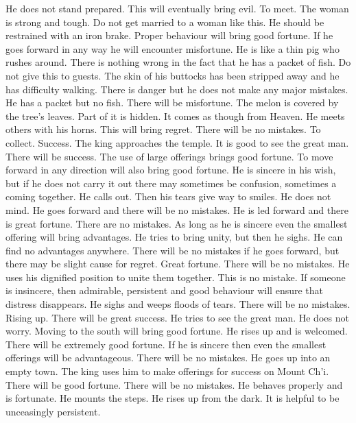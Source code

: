 	{He does not stand prepared. This will eventually bring evil.}
\or {}
	{To meet. The woman is strong and tough. Do not get married to a woman like this.}
	{He should be restrained with an iron brake. Proper behaviour will bring good fortune. If he goes forward
		in any way he will encounter misfortune. He is like a thin pig who rushes around.}
	{There is nothing wrong in the fact that he has a packet of fish. Do not give this to guests.}
	{The skin of his buttocks has been stripped away and he has difficulty walking. There is danger but he
		does not make any major mistakes.}
	{He has a packet but no fish. There will be misfortune.}
	{The melon is covered by the tree's leaves. Part of it is hidden. It comes as though from Heaven.}
	{He meets others with his horns. This will bring regret. There will be no mistakes.}
\or {}
	{To collect. Success. The king approaches the temple. It is good to see the great man. There will be
		success. The use of large offerings brings good fortune. To move forward in any direction
		will also bring good fortune.}
	{He is sincere in his wish, but if he does not carry it out there may sometimes be confusion, sometimes
		a coming together. He calls out. Then his tears give way to smiles. He does not mind. He goes
		forward and there will be no mistakes.}
	{He is led forward and there is great fortune. There are no mistakes. As long as he is sincere even the
		smallest offering will bring advantages.}
	{He tries to bring unity, but then he sighs. He can find no advantages anywhere. There will be no
		mistakes if he goes forward, but there may be slight cause for regret.}
	{Great fortune. There will be no mistakes.}
	{He uses his dignified position to unite them together. This is no mistake. If someone is insincere,
		then admirable, persistent and good behaviour will ensure that distress disappears.}
	{He sighs and weeps floods of tears. There will be no mistakes.}
\or {}
	{Rising up. There will be great success. He tries to see the great man. He does not worry. Moving to
		the south will bring good fortune.}
	{He rises up and is welcomed. There will be extremely good fortune.}
	{If he is sincere then even the smallest offerings will be advantageous. There will be no mistakes.}
	{He goes up into an empty town.}
	{The king uses him to make offerings for success on Mount Ch'i. There will be good fortune. There
		will be no mistakes.}
	{He behaves properly and is fortunate. He mounts the steps.}
	{He rises up from the dark. It is helpful to be unceasingly persistent.}
